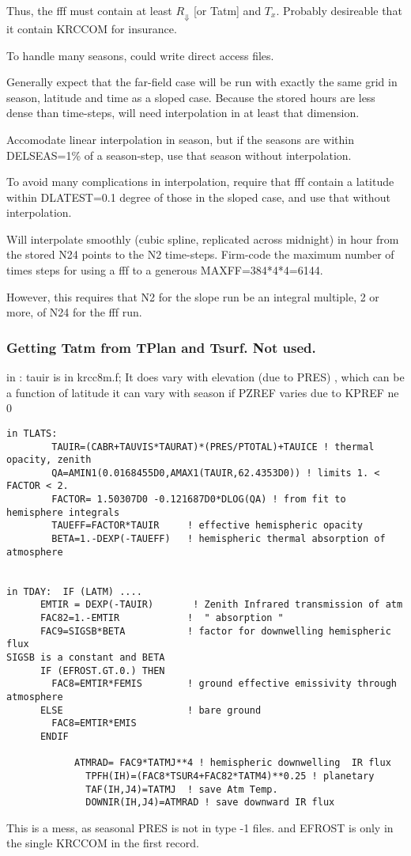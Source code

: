 Thus, the fff must contain at least  $R_{\Downarrow}$ [or Tatm] and $T_x$. 
Probably desireable that it contain KRCCOM for insurance.

To handle many seasons, could write direct access files.


Generally expect that the far-field case will be run with exactly the same grid in
season, latitude and time as a sloped case. Because the stored hours are less
dense than time-steps, will need interpolation in at least that dimension.

Accomodate linear interpolation in season, but if the seasons are within
DELSEAS=1\% of a season-step, use that season without interpolation.

To avoid many complications in interpolation, require that fff contain a
latitude within DLATEST=0.1 degree of those in the sloped case, and use that
without interpolation.

Will interpolate smoothly (cubic spline, replicated across midnight) in hour
from the stored N24 points to the N2 time-steps. Firm-code the maximum number of
times steps for using a fff to a generous MAXFF=384*4*4=6144.

However, this requires that N2 for the slope run be an integral multiple, 2 or
more, of N24 for the fff run.


 

\subsubsection{Getting Tatm from TPlan and Tsurf. Not used.}
in :  tauir is in krcc8m.f;
 \qi It does vary with elevation (due to PRES) , which can be a function of latitude
\qi  it can vary with season if PZREF varies due to KPREF ne 0
\vspace{-3.mm} 
\begin{verbatim}
in TLATS:
        TAUIR=(CABR+TAUVIS*TAURAT)*(PRES/PTOTAL)+TAUICE ! thermal opacity, zenith
        QA=AMIN1(0.0168455D0,AMAX1(TAUIR,62.4353D0)) ! limits 1. < FACTOR < 2.
        FACTOR= 1.50307D0 -0.121687D0*DLOG(QA) ! from fit to hemisphere integrals
        TAUEFF=FACTOR*TAUIR     ! effective hemispheric opacity
        BETA=1.-DEXP(-TAUEFF)   ! hemispheric thermal absorption of atmosphere


in TDAY:  IF (LATM) ....
      EMTIR = DEXP(-TAUIR)       ! Zenith Infrared transmission of atm
      FAC82=1.-EMTIR            !  " absorption "
      FAC9=SIGSB*BETA           ! factor for downwelling hemispheric flux
SIGSB is a constant and BETA
      IF (EFROST.GT.0.) THEN
        FAC8=EMTIR*FEMIS        ! ground effective emissivity through atmosphere
      ELSE                      ! bare ground
        FAC8=EMTIR*EMIS
      ENDIF

            ATMRAD= FAC9*TATMJ**4 ! hemispheric downwelling  IR flux
              TPFH(IH)=(FAC8*TSUR4+FAC82*TATM4)**0.25 ! planetary  
              TAF(IH,J4)=TATMJ  ! save Atm Temp.
              DOWNIR(IH,J4)=ATMRAD ! save downward IR flux
\end{verbatim}
This is a mess, as seasonal PRES is not in type -1 files.
and EFROST is only in the single KRCCOM in the first record.


